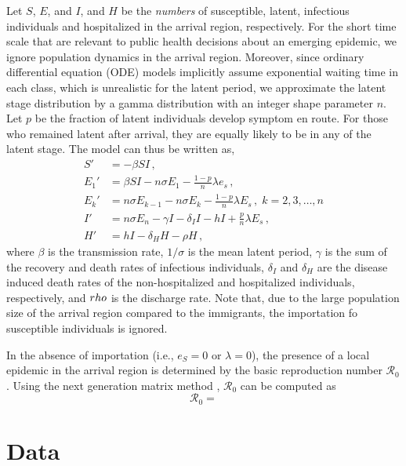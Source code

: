 \documentclass[12pt]{article}
\newcommand{\R}{{\mathcal R}}
\begin{document}
Let $S$, $E$, and $I$, and $H$ be the \emph{numbers} of susceptible, latent, infectious individuals and hospitalized in the arrival region, respectively. For the short time scale that are relevant to public health decisions about an emerging epidemic, we ignore population dynamics in the arrival region. Moreover, since ordinary differential equation (ODE) models implicitly assume exponential waiting time in each class, which is unrealistic for the latent period, we approximate the latent stage distribution by a gamma distribution with an integer shape parameter $n$. Let $p$ be the fraction of latent individuals develop symptom en route. For those who remained latent after arrival, they are equally likely to be in any of the latent stage. The model can thus be written as, 
\begin{subequations}
	\label{eq:model}
	\begin{align}
	S' &= -\beta SI \,, \label{eq:S}\\
	E_1' &= \beta SI - n\sigma E_1 - \frac {1-p}{n}\lambda e_s \,, \label{eq:E1} \\
	E_k' &= n\sigma E_{k-1} - n\sigma E_k - \frac {1-p}{n}\lambda E_s \,, \; k=2,3,\dots,n\label{eq:E1}\\
	I' &= n\sigma E_n -\gamma I - \delta_I I - hI + \frac {p}{n}\lambda E_s \,,\label{eq:I}\\
	H' &=  hI -\delta_H H - \rho H \,,\label{eq:H}
	\end{align}
\end{subequations}
where $\beta$ is the transmission rate, $1/\sigma$ is the mean latent period, $\gamma$ is the sum of the recovery and death rates of infectious individuals, $\delta_I$ and $\delta_H$ are the disease induced death rates of the non-hospitalized and hospitalized individuals, respectively, and $\\rho$ is the discharge rate. Note that, due to the large population size of the arrival region compared to the immigrants, the importation fo susceptible individuals is ignored.

In the absence of importation (i.e., $e_S=0$ or $\lambda=0$), the presence of a local epidemic in the arrival region is determined by the basic reproduction number $\R_0$. Using the next generation matrix method \cite{vandWalt2002},  $\R_0$ can be computed as
\begin{equation}
\label{eq:R0}
\R_0 = 
\end{equation}

\section{Data}
\end{document}
